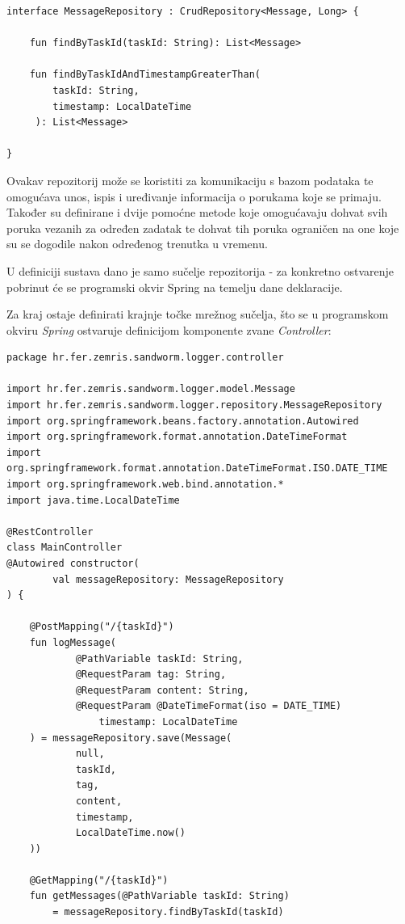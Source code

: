 \documentclass[times, utf8, zavrsni]{fer}
\begin{document}
{\begin{lstlisting}
interface MessageRepository : CrudRepository<Message, Long> {

    fun findByTaskId(taskId: String): List<Message>

    fun findByTaskIdAndTimestampGreaterThan(
	 	taskId: String,
		timestamp: LocalDateTime
	 ): List<Message>

}
\end{lstlisting}

Ovakav repozitorij može se koristiti za komunikaciju s bazom podataka te omogućava unos, ispis i uređivanje informacija o porukama koje se primaju. Također su definirane i dvije pomoćne metode koje omogućavaju dohvat svih poruka vezanih za određen zadatak te dohvat tih poruka ograničen na one koje su se dogodile nakon određenog trenutka u vremenu.

U definiciji sustava dano je samo sučelje repozitorija - za konkretno ostvarenje pobrinut će se programski okvir Spring na temelju dane deklaracije.

Za kraj ostaje definirati krajnje točke mrežnog sučelja, što se u programskom okviru {\textit{Spring}} ostvaruje definicijom komponente zvane {\textit{Controller}}:

\begin{lstlisting}
package hr.fer.zemris.sandworm.logger.controller

import hr.fer.zemris.sandworm.logger.model.Message
import hr.fer.zemris.sandworm.logger.repository.MessageRepository
import org.springframework.beans.factory.annotation.Autowired
import org.springframework.format.annotation.DateTimeFormat
import org.springframework.format.annotation.DateTimeFormat.ISO.DATE_TIME
import org.springframework.web.bind.annotation.*
import java.time.LocalDateTime

@RestController
class MainController
@Autowired constructor(
        val messageRepository: MessageRepository
) {

    @PostMapping("/{taskId}")
    fun logMessage(
            @PathVariable taskId: String,
            @RequestParam tag: String,
            @RequestParam content: String,
            @RequestParam @DateTimeFormat(iso = DATE_TIME)
				timestamp: LocalDateTime
    ) = messageRepository.save(Message(
            null,
            taskId,
            tag,
            content,
            timestamp,
            LocalDateTime.now()
    ))

    @GetMapping("/{taskId}")
    fun getMessages(@PathVariable taskId: String)
	 	= messageRepository.findByTaskId(taskId)


\end{lstlisting}}
\end{document}

